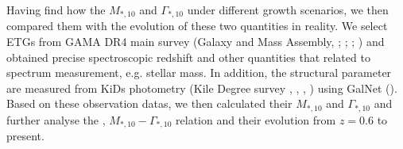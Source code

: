 \documentclass[fleqn,usenatbib]{mnras}
\begin{document}
\par Having find how the $M_{*,10}$ and $\Gamma_{*,10}$ under different growth scenarios, we then compared them with the evolution of these two quantities in reality. We select ETGs from GAMA DR4 main survey (Galaxy and Mass Assembly, \cite{GAMAmain};\cite{bellstedt_galaxy_2020} ; \cite{GAMA1}; \cite{GAMA2}) and obtained precise spectroscopic redshift and other quantities that related to spectrum measurement, e.g. stellar mass. In addition, 
the structural parameter are measured from KiDs photometry (Kile Degree survey , \cite{kuijken_fourth_2019}, \cite{KiDs_Roy}, \cite{Amaro_rejection_2021}) using GalNet (\cite{GaLNet2022}). Based on these observation datas,  we then calculated their $M_{*,10} $ and $\Gamma_{*,10}$ and further analyse the , $M_{*,10} - \Gamma_{*,10}$ relation and their evolution from $z = 0.6$ to present. 
\end{document}
